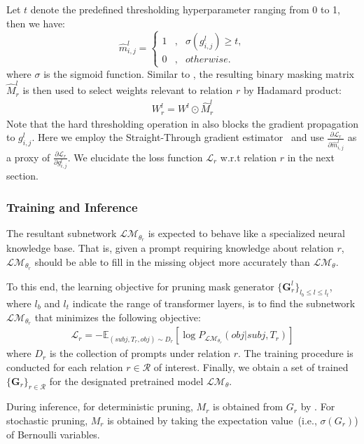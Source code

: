 Let $t$ denote the predefined thresholding hyperparameter ranging from 0 to 1, then we have:
\begin{equation}
\label{eq:hard}
\hat{m}_{i,j}^l=\left\{
\begin{aligned}
1 & , & \sigma(g_{i,j}^l)\ge t, \\
0 & , & otherwise.
\end{aligned}
\right.
\end{equation}
where $\sigma$ is the sigmoid function. Similar to , the resulting binary masking matrix $\hat{M}_r^l$ is then used to select weights relevant to relation $r$ by Hadamard product:
\begin{align}
	\label{eq:deterministic}
	W_r^l = W^l \odot \hat{M}_r^l
\end{align}
Note that the hard thresholding operation in  also blocks the gradient propagation to $g_{i,j}^l$. Here we employ the Straight-Through gradient estimator~\citep{NIPS2016_d8330f85,zhao2020} and use $\frac{\partial \mathcal{L}_r}{\partial \hat{m}_{i,j}^l}$ as a proxy of $\frac{\partial \mathcal{L}_r}{\partial g_{i,j}^l}$.  We elucidate the loss function $\mathcal{L}_r$ w.r.t relation $r$ in the next section.


\subsubsection{Training and Inference}
\label{sec:training}
The resultant subnetwork $\mathcal{LM}_{\theta_r}$ is expected to behave like a specialized neural knowledge base. That is, given a prompt requiring knowledge about relation $r$, $\mathcal{LM}_{\theta_r}$ should be able to fill in the missing object more accurately than $\mathcal{LM}_{\theta}$.

To this end, the learning objective for pruning mask generator 
$\{\bm{G}_r^l\}_{l_b \leq l \leq l_t}$, where $l_b$ and $l_t$ indicate 
the range of transformer layers, is to find the subnetwork 
$\mathcal{LM}_{\theta_r}$ that minimizes the following objective:
\begin{align}
	\mathcal{L}_r=-\mathbb{E}_{(subj, T_r, obj)\sim D_r}[\log{P_{\mathcal{LM}_{\theta_r}}(obj|subj, T_r)}]
	\label{eq:objective}
\end{align}
where $D_r$ is the collection of prompts under relation $r$. The training procedure is conducted for each relation $r\in \mathcal{R}$ of interest. Finally, we obtain a set of trained $\{\bm{G}_r\}_{r\in \mathcal{R}}$ for the designated pretrained model $\mathcal{LM}_\theta$.

During inference, for deterministic pruning, $M_r$ is obtained from $G_r$ by . For stochastic pruning, $M_r$ is obtained by taking the expectation value~(i.e., $\sigma(G_r)$) of Bernoulli variables.
